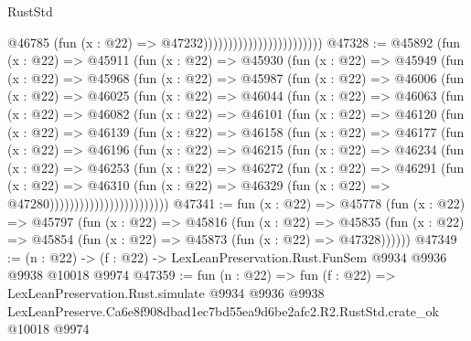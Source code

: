 \begin{lexlean}{RustStd}
\begin{coremodule}
                                                @46785
                                                  (fun (x : @22) => @47232))))))))))))))))))))))))
@47328 := @45892
    (fun (x : @22) =>
    @45911
      (fun (x : @22) =>
      @45930
        (fun (x : @22) =>
        @45949
          (fun (x : @22) =>
          @45968
            (fun (x : @22) =>
            @45987
              (fun (x : @22) =>
              @46006
                (fun (x : @22) =>
                @46025
                  (fun (x : @22) =>
                  @46044
                    (fun (x : @22) =>
                    @46063
                      (fun (x : @22) =>
                      @46082
                        (fun (x : @22) =>
                        @46101
                          (fun (x : @22) =>
                          @46120
                            (fun (x : @22) =>
                            @46139
                              (fun (x : @22) =>
                              @46158
                                (fun (x : @22) =>
                                @46177
                                  (fun (x : @22) =>
                                  @46196
                                    (fun (x : @22) =>
                                    @46215
                                      (fun (x : @22) =>
                                      @46234
                                        (fun (x : @22) =>
                                        @46253
                                          (fun (x : @22) =>
                                          @46272
                                            (fun (x : @22) =>
                                            @46291
                                              (fun (x : @22) =>
                                              @46310
                                                (fun (x : @22) =>
                                                @46329
                                                  (fun (x : @22) => @47280))))))))))))))))))))))))
@47341 := fun (x : @22) =>
  @45778
    (fun (x : @22) =>
    @45797
      (fun (x : @22) =>
      @45816
        (fun (x : @22) =>
        @45835 (fun (x : @22) => @45854 (fun (x : @22) => @45873 (fun (x : @22) => @47328))))))
@47349 := (n : @22) -> (f : @22) -> LexLeanPreservation.Rust.FunSem @9934 @9936 @9938 @10018 @9974
@47359 := fun (n : @22) =>
  fun (f : @22) =>
  LexLeanPreservation.Rust.simulate
    @9934
    @9936
    @9938
    LexLeanPreserve.Ca6e8f908dbad1ec7bd55ea9d6be2afc2.R2.RustStd.crate_ok
    @10018
    @9974
\end{coremodule}
\end{lexlean}

